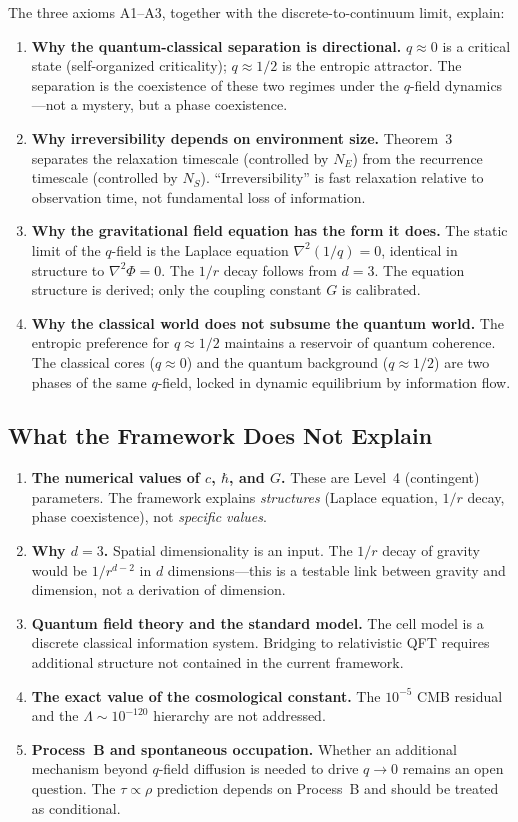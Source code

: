 \documentclass[reprint]{revtex4-2}
\begin{document}
The three axioms A1--A3, together with the discrete-to-continuum limit, explain:
\begin{enumerate}
\item \textbf{Why the quantum-classical separation is directional.} $q\approx 0$ is a critical state (self-organized criticality); $q\approx 1/2$ is the entropic attractor. The separation is the coexistence of these two regimes under the $q$-field dynamics---not a mystery, but a phase coexistence.
\item \textbf{Why irreversibility depends on environment size.} Theorem~3 separates the relaxation timescale (controlled by $N_E$) from the recurrence timescale (controlled by $N_S$). ``Irreversibility'' is fast relaxation relative to observation time, not fundamental loss of information.
\item \textbf{Why the gravitational field equation has the form it does.} The static limit of the $q$-field is the Laplace equation $\nabla^2(1/q)=0$, identical in structure to $\nabla^2\Phi=0$. The $1/r$ decay follows from $d=3$. The equation structure is derived; only the coupling constant $G$ is calibrated.
\item \textbf{Why the classical world does not subsume the quantum world.} The entropic preference for $q\approx 1/2$ maintains a reservoir of quantum coherence. The classical cores ($q\approx 0$) and the quantum background ($q\approx 1/2$) are two phases of the same $q$-field, locked in dynamic equilibrium by information flow.
\end{enumerate}

\subsection{What the Framework Does Not Explain}

\begin{enumerate}
\item \textbf{The numerical values of $c$, $\hbar$, and $G$.} These are Level~4 (contingent) parameters. The framework explains \emph{structures} (Laplace equation, $1/r$ decay, phase coexistence), not \emph{specific values}.
\item \textbf{Why $d=3$.} Spatial dimensionality is an input. The $1/r$ decay of gravity would be $1/r^{d-2}$ in $d$ dimensions---this is a testable link between gravity and dimension, not a derivation of dimension.
\item \textbf{Quantum field theory and the standard model.} The cell model is a discrete classical information system. Bridging to relativistic QFT requires additional structure not contained in the current framework.
\item \textbf{The exact value of the cosmological constant.} The $10^{-5}$ CMB residual and the $\Lambda\sim 10^{-120}$ hierarchy are not addressed.
\item \textbf{Process~B and spontaneous occupation.} Whether an additional mechanism beyond $q$-field diffusion is needed to drive $q\to 0$ remains an open question. The $\tau\propto\rho$ prediction depends on Process~B and should be treated as conditional.
\end{enumerate}
\end{document}
